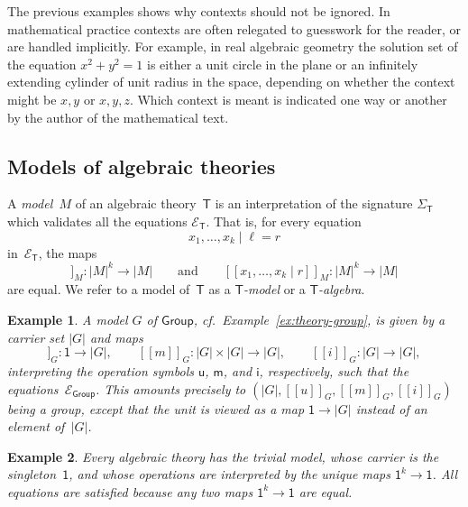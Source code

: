 \documentclass{amsart}
\newcommand{\theory}[1]{\mathsf{#1}} %
\newcommand{\signature}[1]{\Sigma_{\theory{#1}}} %
\newcommand{\equations}[1]{\mathcal{E}_{\theory{#1}}} %
\newcommand{\carrier}[1]{|#1|} %
\newcommand{\one}{\mathsf{1}} %
\newcommand{\sem}[1]{[\![#1]\!]} %
\newtheorem{example}{Example}[section]
\begin{document}
The previous examples shows why contexts should not be ignored. In mathematical practice
contexts are often relegated to guesswork for the reader, or are handled implicitly. For
example, in real algebraic geometry the solution set of the equation $x^2 + y^2 = 1$ is
either a unit circle in the plane or an infinitely extending cylinder of unit radius in
the space, depending on whether the context might be $x, y$ or $x, y, z$. Which context is
meant is indicated one way or another by the author of the mathematical text.

\subsection{Models of algebraic theories}
\label{sec:models-algebr-theor}

A \emph{model~$M$} of an algebraic theory~$\theory{T}$ is an interpretation of the signature
$\signature{T}$ which validates all the equations $\equations{T}$. That is, for every
equation
%
\begin{equation*}
  x_1, \ldots, x_k \mid \ell = r
\end{equation*}
%
in~$\equations{T}$, the maps
%
\begin{equation*}
  \sem{x_1, \ldots, x_k \mid \ell}_M : \carrier{M}^k \to \carrier{M}
  \qquad\text{and}\qquad
  \sem{x_1, \ldots, x_k \mid r}_M : \carrier{M}^k \to \carrier{M}
\end{equation*}
%
are equal. We refer to a model of~$\theory{T}$ as a \emph{$\theory{T}$-model} or
a \emph{$\theory{T}$-algebra}.

\begin{example}
  A model $G$ of $\theory{Group}$, cf.\ Example~\ref{ex:theory-group}, is given by a
  carrier set $\carrier{G}$ and maps
  \begin{equation*}
    \sem{u}_G : \one \to \carrier{G},\qquad
    \sem{m}_G : \carrier{G} \times \carrier{G} \to \carrier{G},\qquad
    \sem{i}_G : \carrier{G} \to \carrier{G},
  \end{equation*}
  interpreting the operation symbols $\mathsf{u}$, $\mathsf{m}$, and
  $\mathsf{i}$, respectively, such that the equations~$\equations{Group}$. This
  amounts precisely to $(\carrier{G}, \sem{u}_G, \sem{m}_G, \sem{i}_G)$ being a
  group, except that the unit is viewed as a map $\one \to \carrier{G}$ instead
  of an element of~$\carrier{G}$.
\end{example}

\begin{example}
  Every algebraic theory has the \emph{trivial model}, whose carrier is the
  singleton~$\one$, and whose operations are interpreted by the unique maps
  $\one^k \to \one$. All equations are satisfied because any two maps $\one^k \to \one$
  are equal.
\end{example}
\end{document}
